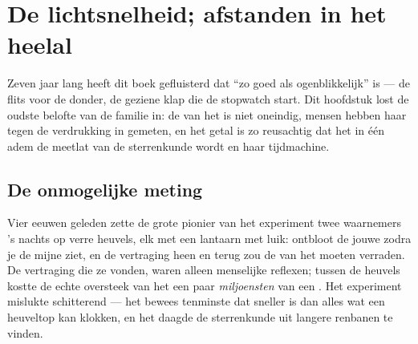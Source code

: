 \chapter{De lichtsnelheid; afstanden in het heelal}\label{ch:g8:speed-of-light}

Zeven jaar lang heeft dit boek gefluisterd dat  ``zo goed als
ogenblikkelijk'' is --- de flits voor de donder, de geziene klap die de
stopwatch start. Dit hoofdstuk lost de oudste belofte van de familie
in: de  van het  is niet oneindig, mensen
hebben haar tegen de verdrukking in gemeten, en het getal is zo
reusachtig dat het in één adem de meetlat van de sterrenkunde wordt en
haar tijdmachine.

\section{De onmogelijke meting}

\begin{example}\label{ex:g8:speed-of-light:galileo}
Vier eeuwen geleden zette de grote pionier van het experiment twee
waarnemers 's nachts op verre heuvels, elk met een lantaarn met luik:
ontbloot de jouwe zodra je de mijne ziet, en de vertraging heen en
terug zou de  van het  moeten verraden. De
vertraging die ze vonden, waren alleen menselijke reflexen; tussen de
heuvels kostte de echte oversteek van het  een paar
\emph{miljoensten} van een . Het experiment mislukte
schitterend --- het bewees tenminste dat  sneller is dan
alles wat een heuveltop kan klokken, en het daagde de sterrenkunde uit
langere renbanen te vinden.
\end{example}

